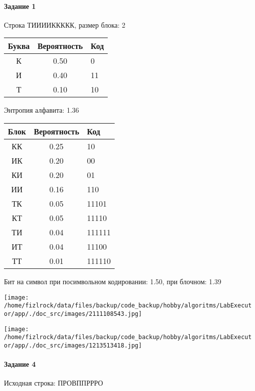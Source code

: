 \documentclass[a4paper, 12pt]{article}
\begin{document}
\paragraph{Задание 1}

Строка ТИИИИККККК, размер блока: 2
\begin{center}
 \begin{tabular}{ |c|c|l| } 
  \hline
     Буква & Вероятность & Код\\ \hline
К & 0.50 & 0\\\hline
И & 0.40 & 11\\\hline
Т & 0.10 & 10
\\ \hline \end{tabular}
\end{center}
Энтропия алфавита: 1.36
\begin{center}
 \begin{tabular}{ |c|c|l| } 
  \hline
     Блок & Вероятность & Код\\ \hline
КК & 0.25 & 10\\\hline
ИК & 0.20 & 00\\\hline
КИ & 0.20 & 01\\\hline
ИИ & 0.16 & 110\\\hline
ТК & 0.05 & 11101\\\hline
КТ & 0.05 & 11110\\\hline
ТИ & 0.04 & 111111\\\hline
ИТ & 0.04 & 11100\\\hline
ТТ & 0.01 & 111110
\\ \hline \end{tabular}
\end{center}
Бит на символ при посимвольном кодировании: 1.50, при блочном: 1.39

\texttt{[image: /home/fizlrock/data/files/backup/code\_backup/hobby/algoritms/LabExecutor/app/./doc\_src/images/2111108543.jpg]}

\texttt{[image: /home/fizlrock/data/files/backup/code\_backup/hobby/algoritms/LabExecutor/app/./doc\_src/images/1213513418.jpg]}
\paragraph{Задание 4}


Исходная строка: ПРОВППРРРО
\end{document}
